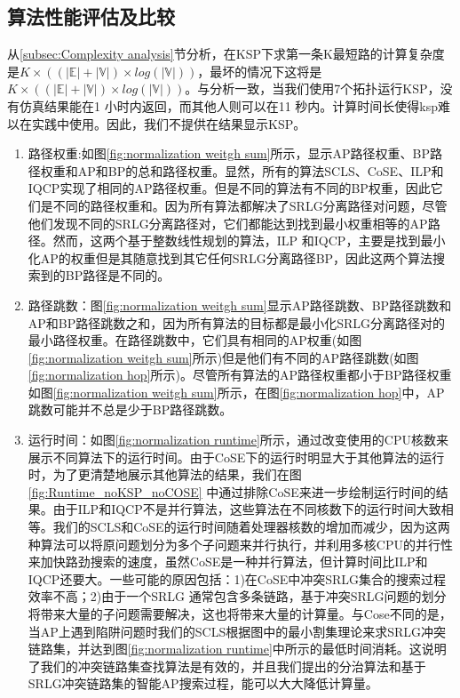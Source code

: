 \subsection{算法性能评估及比较}
从\ref{subsec:Complexity analysis}节分析，在KSP下求第一条K最短路的计算复杂度是$K\times ((|\mathbb{E}|+|\mathbb{V}|)\times log(|\mathbb{V}|))$，最坏的情况下这将是$K\times ((|\mathbb{E}|+|\mathbb{V}|)\times log(|\mathbb{V}|))$。与分析一致，当我们使用7个拓扑运行KSP，没有仿真结果能在1 小时内返回，而其他人则可以在11 秒内。计算时间长使得ksp难以在实践中使用。因此，我们不提供在结果显示KSP。
\begin{enumerate}
  \item 路径权重:如图\ref{fig:normalization weitgh sum}所示，显示AP路径权重、BP路径权重和AP和BP的总和路径权重。显然，所有的算法SCLS、CoSE、ILP和IQCP实现了相同的AP路径权重。但是不同的算法有不同的BP权重，因此它们是不同的路径权重和。因为所有算法都解决了SRLG分离路径对问题，尽管他们发现不同的SRLG分离路径对，它们都能达到找到最小权重相等的AP路径。然而，这两个基于整数线性规划的算法，ILP 和IQCP，主要是找到最小化AP的权重但是其随意找到其它任何SRLG分离路径BP，因此这两个算法搜索到的BP路径是不同的。
  \item 路径跳数：图\ref{fig:normalization weitgh sum}显示AP路径跳数、BP路径跳数和AP和BP路径跳数之和，因为所有算法的目标都是最小化SRLG分离路径对的最小路径权重。在路径跳数中，它们具有相同的AP权重(如图\ref{fig:normalization weitgh sum}所示)但是他们有不同的AP路径跳数(如图\ref{fig:normalization hop}所示)。尽管所有算法的AP路径权重都小于BP路径权重如图\ref{fig:normalization weitgh sum}所示，在图\ref{fig:normalization hop}中，AP跳数可能并不总是少于BP路径跳数。
  \item 运行时间：如图\ref{fig:normalization runtime}所示，通过改变使用的CPU核数来展示不同算法下的运行时间。由于CoSE下的运行时明显大于其他算法的运行时，为了更清楚地展示其他算法的结果，我们在图\ref{fig:Runtime_noKSP_noCOSE} 中通过排除CoSE来进一步绘制运行时间的结果。由于ILP和IQCP不是并行算法，这些算法在不同核数下的运行时间大致相等。我们的SCLS和CoSE的运行时间随着处理器核数的增加而减少，因为这两种算法可以将原问题划分为多个子问题来并行执行，并利用多核CPU的并行性来加快路劲搜索的速度，虽然CoSE是一种并行算法，但计算时间比ILP和IQCP还要大。一些可能的原因包括：1)在CoSE中冲突SRLG集合的搜索过程效率不高；2)由于一个SRLG 通常包含多条链路，基于冲突SRLG问题的划分将带来大量的子问题需要解决，这也将带来大量的计算量。与Cose不同的是，当AP上遇到陷阱问题时我们的SCLS根据图中的最小割集理论来求SRLG冲突链路集，并达到图\ref{fig:normalization runtime}中所示的最低时间消耗。这说明了我们的冲突链路集查找算法是有效的，并且我们提出的分治算法和基于SRLG冲突链路集的智能AP搜索过程，能可以大大降低计算量。

\end{enumerate}
